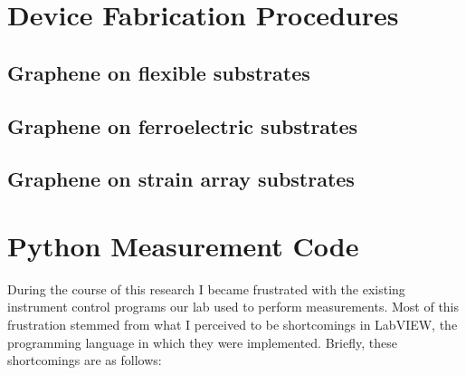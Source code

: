 \documentclass[edeposit,fullpage,draftthesis]{uiucthesis2009}
\begin{document}
\begin{appendices}

\chapter{Device Fabrication Procedures}
\label{appendix:fab}
\section{Graphene on flexible substrates}
\section{Graphene on ferroelectric substrates}
\section{Graphene on strain array substrates}

\chapter{Python Measurement Code}

During the course of this research I became frustrated with the existing instrument control programs
our lab used to perform measurements.
Most of this frustration stemmed from what I perceived to be shortcomings in LabVIEW, the programming
language in which they were implemented. Briefly, these shortcomings are as follows:


\end{appendices}
\end{document}
